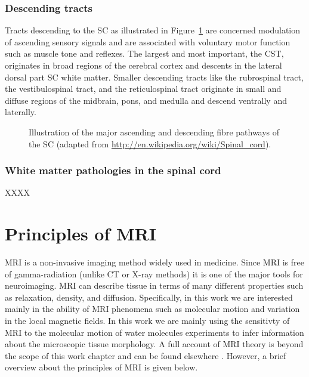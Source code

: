 \subsubsection*{Descending tracts}
\label{sec:chap2:descendingtracts}
Tracts descending to the {\gls{SC}} as illustrated in Figure~\ref{fig:chapter 2 spinal_cord_anatomy} are concerned modulation of ascending sensory signals and are associated with voluntary motor function such as muscle tone and reflexes. The largest and most important, the {\gls{CST}}, originates in broad regions of the cerebral cortex and descents in the lateral dorsal part {\gls{SC}} white matter. Smaller descending tracts like the rubrospinal tract, the vestibulospinal tract, and the reticulospinal tract originate in small and diffuse regions of the midbrain, pons, and medulla and descend ventrally and laterally.
\begin{figure}
 \centering
  \caption{Illustration of the major ascending and descending fibre pathways of the {\protect\gls{SC}} (adapted from \url{http://en.wikipedia.org/wiki/Spinal_cord}).}
  \label{fig:chapter 2 spinal_cord_anatomy}
\end{figure}
\subsubsection*{White matter pathologies in the spinal cord}
XXXX

\section{Principles of {\protect\acrlong{MRI}}}
\Gls{MRI} is a non-invasive imaging method widely used in medicine. Since \gls{MRI} is free of gamma-radiation (unlike CT or X-ray methods) it is one of the major tools for neuroimaging. \Gls{MRI} can describe tissue in terms of many different properties such as relaxation, density, and diffusion. Specifically, in this work we are interested mainly in the ability of MRI phenomena such as molecular motion and variation in the local magnetic fields. In this work we are mainly using the sensitivty of MRI to the molecular motion of water molecules experiments to infer information about the microscopic tissue morphology. A full account of MRI theory is beyond the scope of this work chapter and can be found elsewhere \citep{MRI Books}. However, a brief overview about the principles of \gls{MRI} is given below.
